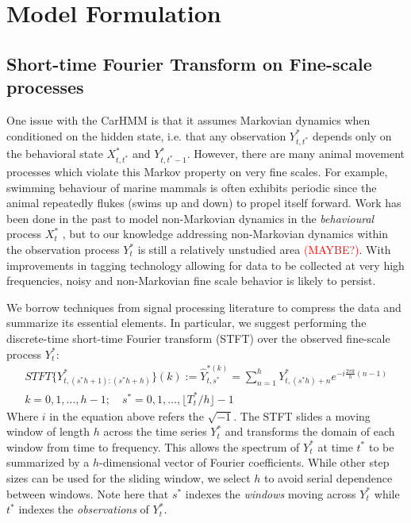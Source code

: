 
\section{Model Formulation}

\subsection{Short-time Fourier Transform on Fine-scale processes}

One issue with the CarHMM is that it assumes Markovian dynamics when conditioned on the hidden state, i.e. that any observation $Y^*_{t,t^*}$ depends only on the behavioral state $X^*_{t,t^*}$ and $Y^*_{t,t^*-1}$. However, there are many animal movement processes which violate this Markov property on very fine scales. For example, swimming behaviour of marine mammals is often exhibits periodic since the animal repeatedly flukes (swims up and down) to propel itself forward. Work has been done in the past to model non-Markovian dynamics in the \textit{behavioural} process $X^*_t$ \cite{Langrock:2012}, but to our knowledge addressing non-Markovian dynamics within the observation process $Y^*_t$ is still a relatively unstudied area \textcolor{red}{(MAYBE?)}. With improvements in tagging technology allowing for data to be collected at very high frequencies, noisy and non-Markovian fine scale behavior is likely to persist.

We borrow techniques from signal processing literature to compress the data and summarize its essential elements. In particular, we suggest performing the discrete-time short-time Fourier transform (STFT) over the observed fine-scale process $Y^*_t$:
%
\begin{align*}
    STFT\{Y^*_{t,(s^*h+1):(s^*h+h) }\}(k) := \hat{Y}^{*(k)}_{t,s^*} = \sum_{n = 1}^{h} Y^*_{t,(s^*h)+n}e^{-i \frac{2\pi k}{h} (n-1)} \\ k = 0, 1, \ldots, h-1; \quad s^* = 0,1, \ldots, \lfloor T^*_t / h \rfloor - 1
\end{align*}
%
Where $i$ in the equation above refers the $\sqrt{-1}$. The STFT slides a moving window of length $h$ across the time series $Y_t^*$ and transforms the domain of each window from time to frequency. This allows the spectrum of $Y_t^*$ at time $t^*$ to be summarized by a $h$-dimensional vector of Fourier coefficients. While other step sizes can be used for the sliding window, we select $h$ to avoid serial dependence between windows. Note here that $s^*$ indexes the \textit{windows} moving across $Y^*_t$ while $t^*$ indexes the \textit{observations} of $Y^*_t$. 

